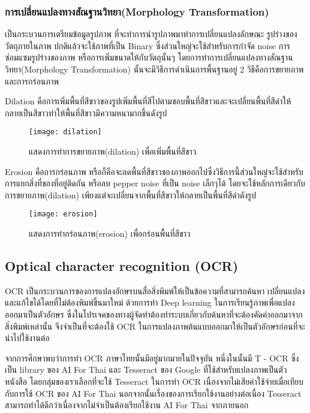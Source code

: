 \subsubsection{การเปลี่ยนแปลงทางสัณฐานวิทยา(Morphology Transformation)}

เป็นกระบวนการเตรียมข้อมูลรูปภาพ  ที่จะทำการนำรูปภาพมาทำการเปลี่ยนแปลงลักษณะ รูปร่างของวัตถุภายในภาพ ปกติแล้วจะใช้ภาพที่เป็น Binary ซึ่งส่วนใหญ่จะใช้สำหรับการกำจัด noise การซ่อมแซมรูปร่างของภาพ หรือการเพิ่มขนาดให้กับวัตถุนั้นๆ โดยการทำการเปลี่ยนแปลงทางสัณฐานวิทยา(Morphology Transformation) นั้นจะมีวิธีการดำเนินการพื้นฐานอยู่ 2 วิธีคือการขยายภาพ และการกร่อนภาพ

Dilation คือการเพิ่มพื้นที่สีขาวของรูปเพิ่มพื้นที่สีไปตามขอบพื้นที่สีขาวและจะเปลี่ยนพื้นที่สีดำให้กลายเป็นสีขาวทำให้พื้นที่สีขาวมีความหนามากขึ้นดังรูป 

\begin{figure}[H]
    \centering
    \texttt{[image: dilation]}
    \caption{แสดงการทำการขยายภาพ(dilation) เพื่อเพิ่มพื้นที่สีขาว}\label{fig:Dilation}
\end{figure}

Erosion คือการกร่อนภาพ หรือก็คือจะลดพื้นที่สีขาวของภาพออกไปซึ่งวิธีการนี้ส่วนใหญ่จะใช้สำหรับการแยกสิ่งที่ของที่อยู่ติดกัน หรือลบ pepper noise ที่เป็น noise เล็กๆได้ โดยจะใช้หลักการเดียวกับการขยายภาพ(dilation) เพียงแต่จะเปลี่ยนจากพื้นที่สีขาวให้กลายเป็นพื้นที่สีดำดังรูป

\begin{figure}[H]
    \centering
    \texttt{[image: erosion]}
    \caption{แสดงการทำกร่อนภาพ(erosion) เพื่อกร่อนพื้นที่สีขาว}\label{fig:Erosion}
\end{figure}

\subsection{Optical character recognition (OCR)}

OCR เป็นกระบวนการของการแปลงอักษรบนสื่อสิ่งพิมพ์ให้เป็นข้อความที่สามารถค้นหา เปลี่ยนแปลงและแก้ไขได้โดยที่ไม่ต้องพิมพ์ขึ้นมาใหม่ ด้วยการทำ Deep learning ในการเรียนรู้ภาพเพื่อแปลงออกมาเป็นตัวอักษร ซึ่งในโปรเจคของทางผู้จัดทำต้องทำระบบเกี่ยวกับค้นหาที่จะต้องคัดคำออกมาจากสิ่งพิมพ์เหล่านั้น จึงจำเป็นที่จะต้องใช้ OCR ในการแปลงภาพต้นแบบออกมาให้เป็นตัวอักษรก่อนที่จะนำไปใช้งานต่อ

จากการศึกษาพบว่าการทำ OCR ภาษาไทยนั้นมีอยู่มากมายในปัจจุบัน หนึ่งในนั้นมี T - OCR ซึ่งเป็น library ของ AI For Thai \cite{nectec} และ Tesseract ของ Google \cite{google} ที่ใช้สำหรับแปลงภาพเป็นตัวหนังสือ โดยกลุ่มของเราเลือกที่จะใช้ Tesseract ในการทำ OCR เนื่องจากไม่เสียค่าใช้จ่ายเมื่อเทียบกับการใช้ OCR ของ AI For Thai นอกจากนั้นเรื่องของการเรียกใช้งานอย่างต่อเนื่อง Tesseract สามารถทำได้ดีกว่าเนื่องจากไม่จำเป็นต้องเรียกใช้งาน AI For Thai จากภายนอก

